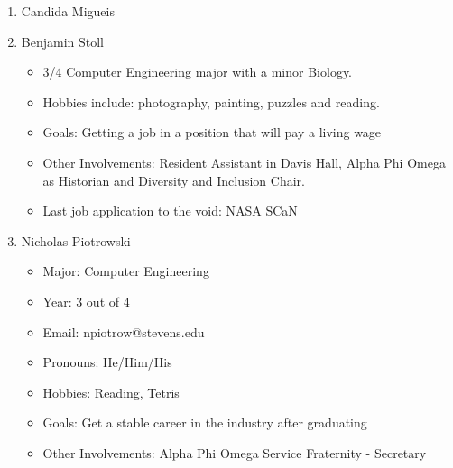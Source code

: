 \begin{enumerate}
    \item Candida Migueis
    \item Benjamin Stoll
        \begin{itemize}
            \item 3/4 Computer Engineering major with a minor Biology. 
            \item Hobbies include: photography, painting, puzzles and reading.
            \item Goals: Getting a job in a position that will pay a living wage
            \item Other Involvements: Resident Assistant in Davis Hall, Alpha Phi Omega as Historian and Diversity and Inclusion Chair.
            \item Last job application to the void: NASA SCaN
        \end{itemize}
    \item Nicholas Piotrowski
        \begin{itemize}
            \item Major: Computer Engineering
            \item Year: 3 out of 4
            \item Email: npiotrow@stevens.edu
            \item Pronouns: He/Him/His
            \item Hobbies: Reading, Tetris
            \item Goals: Get a stable career in the industry after graduating
            \item Other Involvements: Alpha Phi Omega Service Fraternity - Secretary
        \end{itemize}
\end{enumerate}
